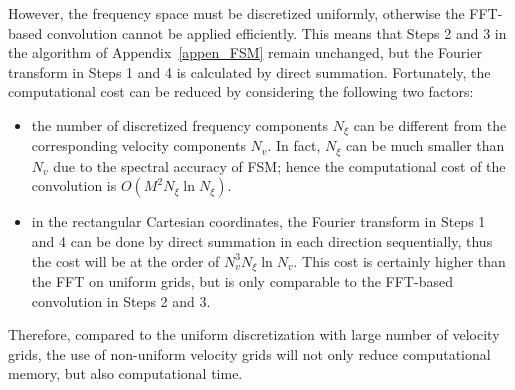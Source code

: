 However, the frequency space must be discretized uniformly, otherwise the FFT-based convolution cannot be applied efficiently. This means that Steps 2 and 3 in the algorithm of Appendix~\ref{appen_FSM} remain unchanged, but the Fourier transform in Steps 1 and 4 is calculated by direct summation. Fortunately, the computational cost can be reduced by considering the following two factors:
\begin{itemize}
	\item the number of discretized frequency components $N_\xi$ can be different from the corresponding velocity components $N_v$. In fact, $N_\xi$ can be much smaller than $N_v$ due to the spectral accuracy of FSM; hence the computational cost of the convolution is $O(M^2N_{\xi}\ln{N_{\xi}})$.
	
	\item in the rectangular Cartesian coordinates, the Fourier transform in Steps 1 and 4 can be done by direct summation in each direction sequentially, thus the cost will be at the order of $N_v^3N_\xi\ln{}N_v$. This cost is certainly higher than the FFT on uniform grids, but is only comparable to the FFT-based convolution in Steps 2 and 3. 
\end{itemize}
Therefore, compared to the uniform discretization with large number of velocity grids, the use of non-uniform velocity grids will not only reduce computational memory, but also computational time.


%
%





